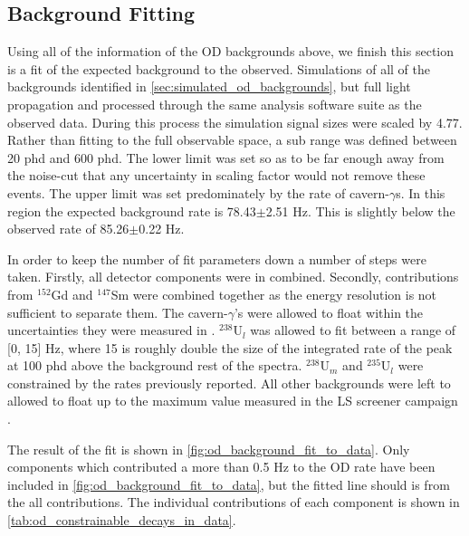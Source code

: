 \subsection{Background Fitting}
\par
Using all of the information of the OD backgrounds above, we finish this section is a fit of the expected background to the observed.
Simulations of all of the backgrounds identified in \autoref{sec:simulated_od_backgrounds}, but full light propagation and processed through the same analysis software suite as the observed data.
During this process the simulation signal sizes were scaled by 4.77.
Rather than fitting to the full observable space, a sub range was defined between 20 phd and 600 phd.
The lower limit was set so as to be far enough away from the noise-cut that any uncertainty in scaling factor would not remove these events.
The upper limit was set predominately by the rate of cavern-$\gamma$s.
In this region the expected background rate is 78.43$\pm$2.51 Hz.
This is slightly below the observed rate of 85.26$\pm$0.22 Hz.
\par
In order to keep the number of fit parameters down a number of steps were taken.
Firstly, all detector components were in combined. 
Secondly, contributions from ${}^{152}$Gd and ${}^{147}$Sm were combined together as the energy resolution is not sufficient to separate them.
The cavern-$\gamma$'s were allowed to float within the uncertainties they were measured in \cite{LZ_Gamma_Ray_Background_ref}.
${}^{238}$U$_l$ was allowed to fit between a range of [0, 15] Hz, where 15 is roughly double the size of the integrated rate of the peak at 100 phd above the background rest of the spectra.
${}^{238}$U$_{m}$ and ${}^{235}$U$_{l}$ were constrained by the rates previously reported.
All other backgrounds were left to allowed to float up to the maximum value measured in the LS screener campaign \cite{scotthaselschwardt_thesis_ref}.
\par
The result of the fit is shown in \autoref{fig:od_background_fit_to_data}.
Only components which contributed a more than 0.5 Hz to the OD rate have been included in \autoref{fig:od_background_fit_to_data}, but the fitted line should is from the all contributions.
The individual contributions of each component is shown in \autoref{tab:od_constrainable_decays_in_data}.

